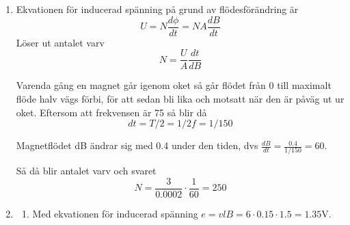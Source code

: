 \documentclass[a4paper,12pt]{article}
\begin{document}
\begin{enumerate}
      \item
            Ekvationen för inducerad spänning på grund av flödesförändring är
            $$U=N\frac{d\phi}{dt}=NA\frac{dB}{dt}$$
            Löser ut antalet varv
            $$N=\frac{U}{A}\frac{dt}{dB}$$

            Varenda gång en magnet går igenom oket så går flödet från 0 till maximalt flöde
            halv vägs förbi, för att sedan bli lika och motsatt när den är påväg ut ur oket.
            Eftersom att frekvensen är 75 så blir då $$dt=T/2=1/2f=1/150$$

            Magnetflödet dB ändrar sig med 0.4 under den tiden, dvs $\frac{dB}{dt}=\frac{0.4}{1/150}=60$.

            Så då blir antalet varv och svaret $$N=\frac{3}{0.0002}\cdot\frac{1}{60}=250$$

      \item
            \begin{enumerate}
                  \item Med ekvationen för inducerad spänning $e=vlB=6\cdot 0.15\cdot 1.5=1.35$V.
            \end{enumerate}
\end{enumerate}
\end{document}
